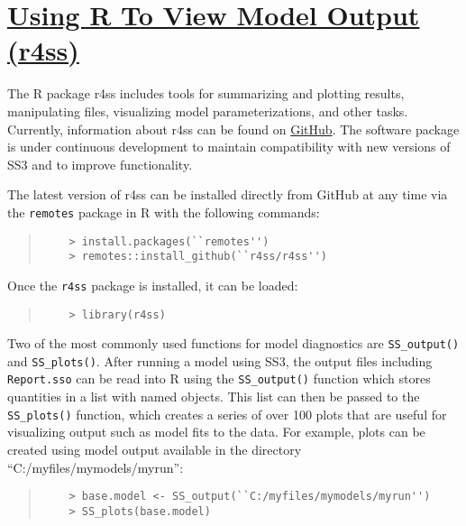 \section[Using R To View Model Output (r4ss)]{\protect\hyperref[sec:r4ss]{Using R To View Model Output (r4ss)}}\label{sec:r4ss}

The R package \gls{r4ss} includes tools for summarizing and plotting results, manipulating files, visualizing model parameterizations, and other tasks. Currently, information about \gls{r4ss} can be found on \href{https://github.com/r4ss/r4ss}{GitHub}.  The software package is under continuous development to maintain compatibility with new versions of SS3 and to improve functionality.

The latest version of \gls{r4ss} can be installed directly from GitHub at any time via the \texttt{remotes} package in R with the following commands:

\begin{quote}
	\begin{verbatim}
	> install.packages(``remotes'')
	> remotes::install_github(``r4ss/r4ss'')
	\end{verbatim}
\end{quote}

Once the \texttt{r4ss} package is installed, it can be loaded:

\begin{quote}
	\begin{verbatim}
	> library(r4ss)
	\end{verbatim}
\end{quote}

Two of the most commonly used functions for model diagnostics are \texttt{SS\_output()} and \texttt{SS\_plots()}. After running a model using SS3, the output files including \texttt{Report.sso} can be read into R using the \texttt{SS\_output()} function which stores quantities in a list with named objects. This list can then be passed to the \texttt{SS\_plots()} function, which creates a series of over 100 plots that are useful for visualizing output such as model fits to the data. For example, plots can be created using model output available in the directory ``C:/myfiles/mymodels/myrun'':

\begin{quote}
	\begin{verbatim}
	> base.model <- SS_output(``C:/myfiles/mymodels/myrun'')
	> SS_plots(base.model)
	\end{verbatim}
\end{quote}
  
